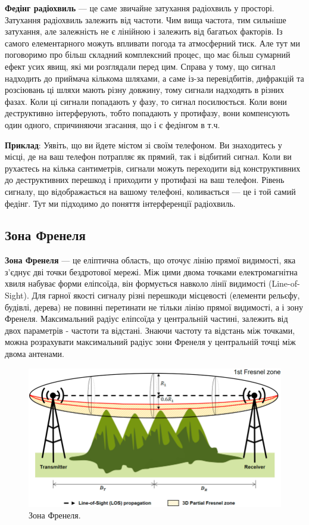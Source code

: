 \documentclass{article}
\begin{document}
\textbf{Федінг радіохвиль} --- це саме звичайне затухання радіохвиль у просторі. Затухання радіохвиль залежить від частоти. Чим вища частота, тим сильніше затухання, але залежність не є лінійною і залежить від багатьох факторів. Із самого елементарного можуть впливати погода та атмосферний тиск. Але тут ми поговоримо про більш складний комплексний процес, що має більш сумарний ефект усих явищ, які ми розглядали перед цим. Справа у тому, що сигнал надходить до приймача кількома шляхами, а саме із-за перевідбитів, дифракцій та розсіювань ці шляхи мають різну довжину, тому сигнали надходять в різних фазах. Коли ці сигнали попадають у фазу, то сигнал посилюється. Коли вони деструктивно інтерферують, тобто попадають у протифазу, вони компенсують один одного, спричиняючи згасання, що і є федінгом в т.ч.

\textbf{Приклад}: Уявіть, що ви йдете містом зі своїм телефоном. Ви знаходитесь у місці, де на ваш телефон потрапляє як прямий, так і відбитий сигнал. Коли ви рухаєтесь на кілька сантиметрів, сигнали можуть переходити від конструктивних до деструктивних перешкод і приходити у протифазі на ваш телефон. Рівень сигналу, що відображається на вашому телефоні, коливається — це і той самий федінг. Тут ми підходимо до поняття інтерференції радіохвиль.

\subsection{Зона Френеля}

\textbf{Зона Френеля} --- це еліптична область, що оточує лінію прямої видимості, яка з'єднує дві точки бездротової мережі. Між цими двома точками електромагнітна хвиля набуває форми еліпсоїда, він формується навколо лінії видимості (Line-of-Sight). Для гарної якості сигналу різні перешкоди місцевості (елементи рельєфу, будівлі, дерева) не повинні перетинати не тільки лінію прямої видимості, а і зону Френеля.  Максимальний радіус еліпсоїда у центральній частині, залежить від двох параметрів - частоти та відстані. Знаючи частоту та відстань між точками, можна розрахувати максимальний радіус зони Френеля у центральній точці між двома антенами.

\begin{figure}[h!]
	\centering
	\includegraphics[width=0.9\linewidth]{images/fresnel-zone.png}
	\caption{\label{fig:fresnel-zone} Зона Френеля.}
\end{figure}
\end{document}
